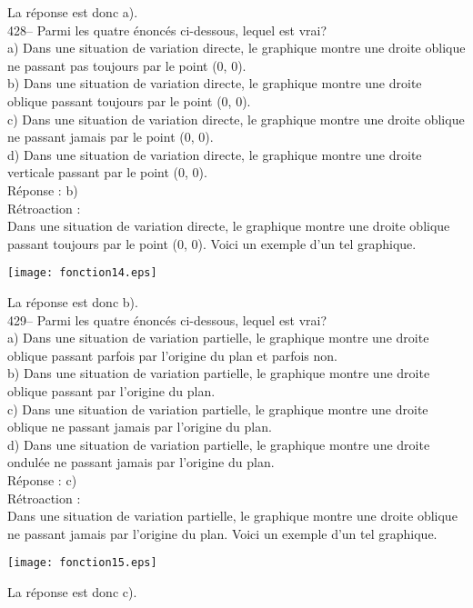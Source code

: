 ﻿\documentclass[letterpaper, 12pt]{article}
\begin{document}
La r\'eponse est donc a).\\

428-- Parmi les quatre \'enonc\'es ci-dessous, lequel est vrai?\\
a) Dans une situation de variation directe, le graphique montre une droite
oblique ne passant pas toujours par le point (0, 0).\\
b) Dans une situation de variation directe, le graphique montre une droite
oblique passant toujours par le point (0, 0).\\
c) Dans une situation de variation directe, le graphique montre une droite
oblique ne passant jamais par le point (0, 0).\\
d) Dans une situation de variation directe, le graphique montre une droite
verticale passant par le point (0, 0).\\

R\'eponse :  b)\\

R\'etroaction : \\
Dans une situation de variation directe, le graphique montre une droite
oblique passant toujours par le point (0, 0).  Voici un exemple d'un tel
graphique.\\
    \begin{center}
    \texttt{[image: fonction14.eps]}
    \end{center}

La r\'eponse est donc b).\\


429-- Parmi les quatre \'enonc\'es ci-dessous, lequel est vrai?\\
a) Dans une situation de variation partielle, le graphique montre une droite
oblique passant parfois par l'origine du plan et parfois non.\\
b) Dans une situation de variation partielle, le graphique montre une droite
oblique passant par l'origine du plan.\\
c) Dans une situation de variation partielle, le graphique montre une droite
oblique ne passant jamais par l'origine du plan.\\
d) Dans une situation de variation partielle, le graphique montre une droite
ondul\'ee ne passant jamais par l'origine du plan.\\

R\'eponse :  c)\\

R\'etroaction : \\
Dans une situation de variation partielle, le graphique montre une droite
oblique ne passant jamais par l'origine du plan.  Voici un exemple d'un tel
graphique.\\
    \begin{center}
    \texttt{[image: fonction15.eps]}
    \end{center}
La r\'eponse est donc c).\\
\end{document}
